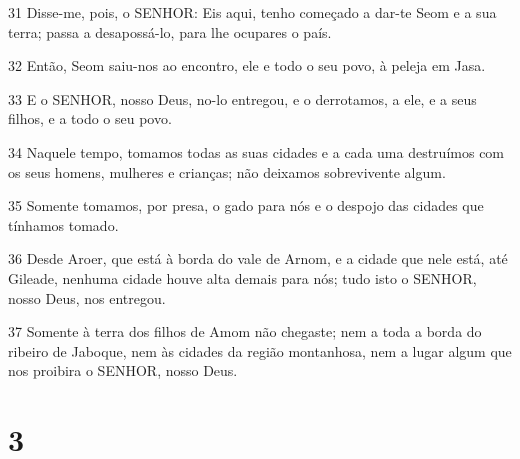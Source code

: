 \par 31 Disse-me, pois, o SENHOR: Eis aqui, tenho começado a dar-te Seom e a sua terra; passa a desapossá-lo, para lhe ocupares o país.
\par 32 Então, Seom saiu-nos ao encontro, ele e todo o seu povo, à peleja em Jasa.
\par 33 E o SENHOR, nosso Deus, no-lo entregou, e o derrotamos, a ele, e a seus filhos, e a todo o seu povo.
\par 34 Naquele tempo, tomamos todas as suas cidades e a cada uma destruímos com os seus homens, mulheres e crianças; não deixamos sobrevivente algum.
\par 35 Somente tomamos, por presa, o gado para nós e o despojo das cidades que tínhamos tomado.
\par 36 Desde Aroer, que está à borda do vale de Arnom, e a cidade que nele está, até Gileade, nenhuma cidade houve alta demais para nós; tudo isto o SENHOR, nosso Deus, nos entregou.
\par 37 Somente à terra dos filhos de Amom não chegaste; nem a toda a borda do ribeiro de Jaboque, nem às cidades da região montanhosa, nem a lugar algum que nos proibira o SENHOR, nosso Deus.

\chapter{3}


